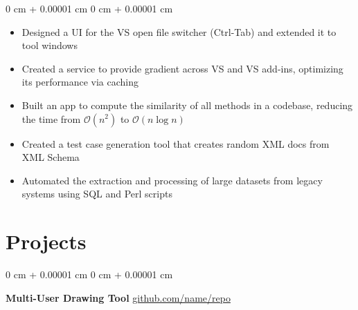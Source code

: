 \documentclass[10pt, letterpaper]{article}
\newenvironment{highlights}{
    \begin{itemize}[
        topsep=0.10 cm,
        parsep=0.10 cm,
        partopsep=0pt,
        itemsep=0pt,
        leftmargin=0 cm + 10pt
    ]
}{
    \end{itemize}
} %
\newenvironment{onecolentry}{
    \begin{adjustwidth}{
        0 cm + 0.00001 cm
    }{
        0 cm + 0.00001 cm
    }
}{
    \end{adjustwidth}
} %
\newenvironment{twocolentry}[2][]{
    \onecolentry
    \def\secondColumn{#2}
    \setcolumnwidth{\fill, 4.5 cm}
    \begin{paracol}{2}
}{
    \switchcolumn \raggedleft \secondColumn
    \end{paracol}
    \endonecolentry
} %
\begin{document}
        \vspace{0.10 cm}
        \begin{onecolentry}
            \begin{highlights}
                \item Designed a UI for the VS open file switcher (Ctrl-Tab) and extended it to tool windows
                \item Created a service to provide gradient across VS and VS add-ins, optimizing its performance via caching
                \item Built an app to compute the similarity of all methods in a codebase, reducing the time from $\mathcal{O}(n^2)$ to $\mathcal{O}(n \log n)$
                \item Created a test case generation tool that creates random XML docs from XML Schema
                \item Automated the extraction and processing of large datasets from legacy systems using SQL and Perl scripts
            \end{highlights}
        \end{onecolentry}


            

                

    \section{Projects}
        \begin{twocolentry}{
            \href{https://github.com/sinaatalay/rendercv}{github.com/name/repo}
        }
            \textbf{Multi-User Drawing Tool}\end{twocolentry}
\end{document}
